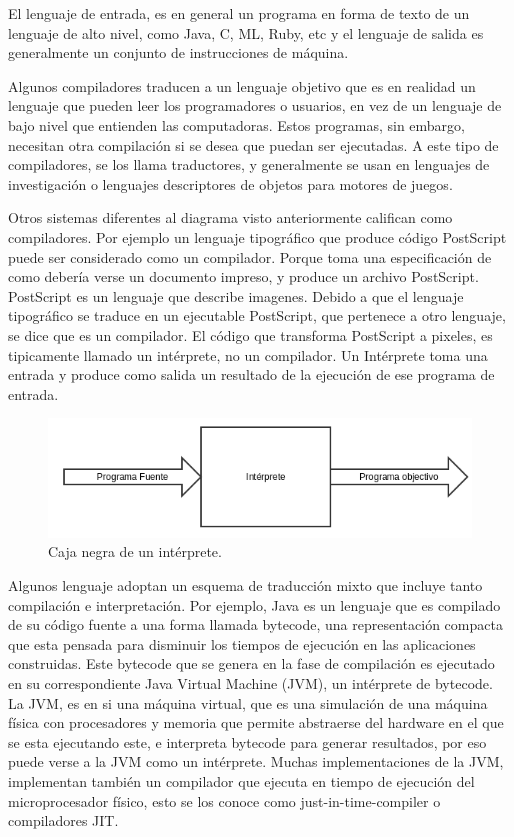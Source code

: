\documentclass[fleqn]{tcdl}
\begin{document}
El lenguaje de entrada, es en general un programa en forma de texto de un lenguaje de alto nivel, como Java, C, ML, Ruby, etc y el lenguaje de salida es generalmente un conjunto de instrucciones de máquina.

Algunos compiladores traducen a un lenguaje objetivo que es en realidad un lenguaje que pueden leer los programadores o usuarios, en vez de un lenguaje de bajo nivel que entienden las computadoras. Estos programas, sin embargo, necesitan otra compilación si se desea que puedan ser ejecutadas. A este tipo de compiladores, se los llama traductores, y generalmente se usan en lenguajes de investigación o lenguajes descriptores de objetos para motores de juegos.


Otros sistemas diferentes al diagrama visto anteriormente califican como compiladores. Por ejemplo un lenguaje tipográfico que produce código PostScript puede ser considerado como un compilador. Porque toma una especificación de como debería verse un documento impreso, y produce un  archivo PostScript. PostScript es un lenguaje que describe imagenes. Debido a que el lenguaje tipográfico se traduce en un ejecutable PostScript, que pertenece a otro lenguaje, se dice que es un compilador. El código que transforma PostScript a pixeles, es tipicamente llamado un intérprete, no un compilador. Un Intérprete toma una entrada y produce como salida un resultado de la ejecución de ese programa de entrada.

\begin{figure}
\captionsetup{type=figure}
\includegraphics[width=\textwidth]{interprete_basico.png}
\caption{\label{fig:inter}Caja negra de un intérprete.}
\end{figure}

Algunos lenguaje adoptan un esquema de traducción mixto que incluye tanto compilación e interpretación. Por ejemplo, Java es un lenguaje que es compilado de su código fuente a una forma llamada bytecode, una representación compacta que esta pensada para disminuir los tiempos de ejecución en las aplicaciones construidas. Este bytecode que se genera en la fase de compilación es ejecutado en su correspondiente Java Virtual Machine (JVM), un intérprete de bytecode. La JVM, es en si una máquina virtual, que es una simulación de una máquina física con procesadores y memoria que permite abstraerse del hardware en el que se esta ejecutando este, e interpreta bytecode para generar resultados, por eso puede verse a la JVM como un intérprete. Muchas implementaciones de la JVM, implementan también un compilador que ejecuta en tiempo de ejecución del microprocesador físico, esto se los conoce como just-in-time-compiler o compiladores JIT.
\end{document}
